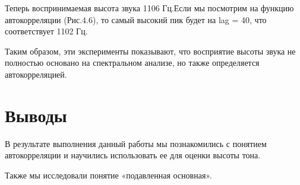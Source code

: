 \documentclass[a4paper,12pt]{report}
\begin{document}
    Теперь воспринимаемая высота звука 1106 Гц.Если мы посмотрим на функцию автокорреляции (Рис.4.6), то самый высокий пик будет на lag = 40, что соответствует 1102 Гц.
    
    Таким образом, эти эксперименты показывают, что восприятие высоты звука не полностью основано на спектральном анализе, но также определяется автокорреляцией.
    
\chapter{Выводы}
    В результате выполнения данный работы мы познакомились с понятием автокорреляции и научились использовать ее для оценки высоты тона.
    
    Также мы исследовали понятие «подавленная основная». 
\end{document}
